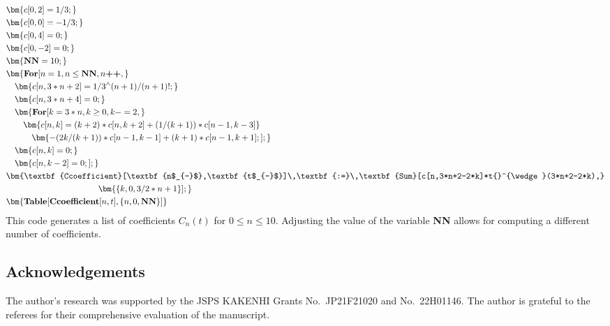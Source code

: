 \documentclass[pdftex]{sigma}
\numberwithin{equation}{section}
\begin{document}
\[
\begin{aligned}
&\bm{c[0,2] = 1/3;} \\
&\bm{c[0,0] = -1/3;} \\
&\bm{c[0,4] = 0;} \\
&\bm{c[0,-2] = 0;} \\
&\bm{\textbf{NN} = 10;} \\
&\bm{\textbf{For}[n = 1, n \leq \textbf{NN}, n\textbf{++},} \\
&\quad \bm{c[n,3*n+2] = 1/3{}^{\wedge}(n+1)/(n+1)!;} \\
&\quad \bm{c[n,3*n+4] = 0;} \\
&\quad \bm{\textbf{For}[k = 3*n, k \geq 0, k-=2,} \\
&\quad \quad \bm{c[n,k] = (k+2)*c[n,k+2] + (1/(k+1))*c[n-1,k-3]} \\
&\quad \quad \quad \bm{- (2k/(k+1))*c[n-1,k-1] + (k+1)*c[n-1,k+1];];} \\
&\quad \bm{c[n,k] = 0;} \\
&\quad \bm{c[n,k-2] = 0;];} \\
&\bm{\textbf{Ccoefficient}[\textbf{n$_{-}$},\textbf{t$_{-}$}]\,\textbf{:=}\,\textbf{Sum}[c[n,3*n+2-2*k]*t{}^{\wedge}(3*n+2-2*k),}\\
& \hphantom{\textbf{Ccoefficient}[\textbf{n$_{-}$},\textbf{t$_{-}$}]\,\textbf{:=}\,} \bm{\{k,0,3/2*n+1\}];} \\
&\bm{\textbf{Table}[\textbf{Ccoefficient}[n,t],\{n,0,\textbf{NN}\}]}
\end{aligned}
\]
This code generates a list of coefficients $C_n(t)$ for $0\le n\le 10$. Adjusting the value of the variable \textbf{NN} allows for computing a different number of coefficients.

\subsection*{Acknowledgements} The author's research was supported by the JSPS KAKENHI Grants No.~JP21F21020 and No.~22H01146. The author is grateful to the referees for their comprehensive evaluation of the manuscript.
\end{document}
